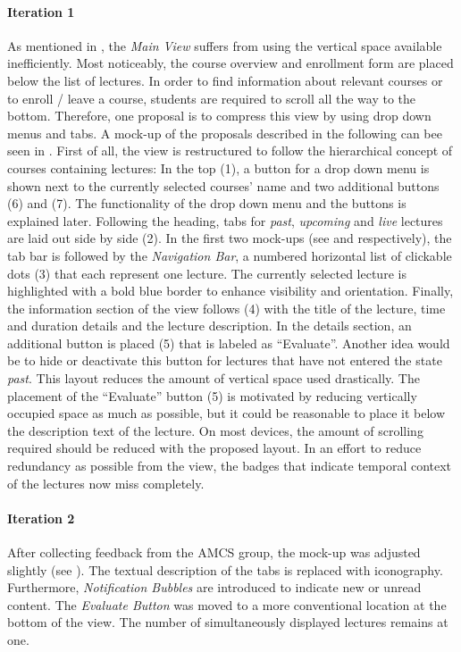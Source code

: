\paragraph{Iteration 1}
As mentioned in , the \emph{Main View} suffers from using the vertical space available inefficiently. Most noticeably, the course overview and enrollment form are placed below the list of lectures. In order to find information about relevant courses or to enroll / leave a course, students are required to scroll all the way to the bottom. 
Therefore, one proposal is to compress this view by using drop down menus and tabs. A mock-up of the proposals described in the following can bee seen in . First of all, the view is restructured to follow the hierarchical concept of courses containing lectures: In the top (1), a button for a drop down menu is shown next to the currently selected courses' name and two additional buttons (6) and (7). The functionality of the drop down menu and the buttons is explained later.
Following the heading, tabs for \emph{past}, \emph{upcoming} and \emph{live} lectures are laid out side by side (2). In the first two mock-ups (see  and  respectively), the tab bar is followed by the \emph{Navigation Bar}, a numbered horizontal list of clickable dots (3) that each represent one lecture. The currently selected lecture is highlighted with a bold blue border to enhance visibility and orientation. Finally, the information section of the view follows (4) with the title of the lecture, time and duration details and the lecture description. In the details section, an additional button is placed (5) that is labeled as “Evaluate”. Another idea would be to hide or deactivate this button for lectures that have not entered the state \emph{past}.
This layout reduces the amount of vertical space used drastically. The placement of the “Evaluate” button (5) is motivated by reducing vertically occupied space as much as possible, but it could be reasonable to place it below the description text of the lecture. On most devices, the amount of scrolling required should be reduced with the proposed layout. In an effort to reduce redundancy as possible from the view, the badges that indicate temporal context of the lectures now miss completely.

\paragraph{Iteration 2}
After collecting feedback from the AMCS group, the mock-up was adjusted slightly (see ). The textual description of the tabs is replaced with iconography. Furthermore, \emph{Notification Bubbles} are introduced to indicate new or unread content. The \emph{Evaluate Button} was moved to a more conventional location at the bottom of the view. The number of simultaneously displayed lectures remains at one.


